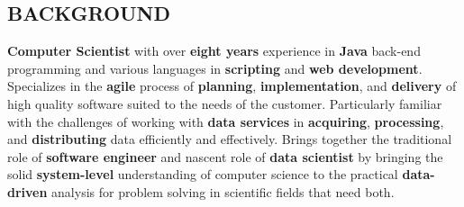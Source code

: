 \documentclass[line,margin]{res}
\begin{document}
\address{104 14th Street, Prairie du Sac, WI 53578}
\address{email: jordan@jordanwalker.us | phone: 608.370.1908}
 
\begin{resume}
 
\section{BACKGROUND}
	\textbf{Computer Scientist} with over \textbf{eight years} experience in \textbf{Java} back-end programming and various languages in \textbf{scripting} and \textbf{web development}.
	Specializes in the \textbf{agile} process of \textbf{planning}, \textbf{implementation}, and \textbf{delivery} of high quality software suited to the needs of the customer.
	Particularly familiar with the challenges of working with \textbf{data services} in \textbf{acquiring}, \textbf{processing}, and \textbf{distributing} data efficiently and effectively.
	Brings together the traditional role of \textbf{software engineer} and nascent role of \textbf{data scientist} by bringing the solid \textbf{system-level} understanding of computer science to the practical \textbf{data-driven} analysis for problem solving in scientific fields that need both.



\end{resume}
\end{document}
